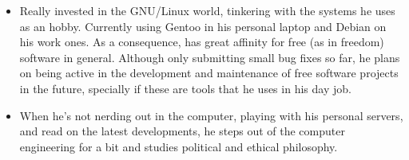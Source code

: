 \documentclass[11pt,a4paper,sans]{moderncv} %
\begin{document}
\begin{itemize}

\item{Really invested in the GNU/Linux world, tinkering with the systems he uses
    as an hobby. Currently using Gentoo in his personal laptop and Debian on his
    work ones. As a consequence, has great affinity for free (as in freedom)
    software in general. Although only submitting small bug fixes so far, he
    plans on being active in the development and maintenance of free software
    projects in the future, specially if these are tools that he uses in his day
    job.}

\vspace{6pt}

\item{When he's not nerding out in the computer, playing with his personal
    servers, and read on the latest developments, he steps out of the computer
    engineering for a bit and studies political and ethical philosophy.}

\end{itemize}


\nocite{*}



\end{document}

